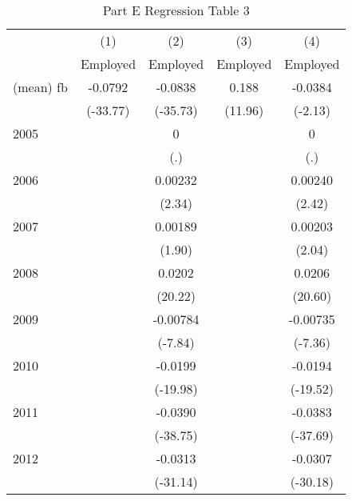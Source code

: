 \begin{table}[htbp]\centering
\caption{Part E Regression Table 3\label{tab1}}
\begin{tabular}{l*{4}{c}}
\hline\hline
                    &\multicolumn{1}{c}{(1)}&\multicolumn{1}{c}{(2)}&\multicolumn{1}{c}{(3)}&\multicolumn{1}{c}{(4)}\\
                    &\multicolumn{1}{c}{Employed}&\multicolumn{1}{c}{Employed}&\multicolumn{1}{c}{Employed}&\multicolumn{1}{c}{Employed}\\
\hline
(mean) fb           &     -0.0792&     -0.0838&       0.188&     -0.0384\\
                    &    (-33.77)&    (-35.73)&     (11.96)&     (-2.13)\\
[1em]
2005                &            &           0&            &           0\\
                    &            &         (.)&            &         (.)\\
[1em]
2006                &            &     0.00232&            &     0.00240\\
                    &            &      (2.34)&            &      (2.42)\\
[1em]
2007                &            &     0.00189&            &     0.00203\\
                    &            &      (1.90)&            &      (2.04)\\
[1em]
2008                &            &      0.0202&            &      0.0206\\
                    &            &     (20.22)&            &     (20.60)\\
[1em]
2009                &            &    -0.00784&            &    -0.00735\\
                    &            &     (-7.84)&            &     (-7.36)\\
[1em]
2010                &            &     -0.0199&            &     -0.0194\\
                    &            &    (-19.98)&            &    (-19.52)\\
[1em]
2011                &            &     -0.0390&            &     -0.0383\\
                    &            &    (-38.75)&            &    (-37.69)\\
[1em]
2012                &            &     -0.0313&            &     -0.0307\\
                    &            &    (-31.14)&            &    (-30.18)\\

\end{tabular}
\end{table}
